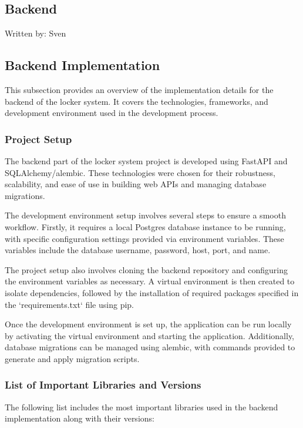\subsection{Backend}
{\tiny Written by: Sven}

\subsection{Backend Implementation} \label{sec:Implementation_Backend}

This subsection provides an overview of the implementation details for the backend of the locker system. It covers the technologies, frameworks, and development environment used in the development process.

\subsubsection{Project Setup}

The backend part of the locker system project is developed using FastAPI and SQLAlchemy/alembic. These technologies were chosen for their robustness, scalability, and ease of use in building web APIs and managing database migrations.

The development environment setup involves several steps to ensure a smooth workflow. Firstly, it requires a local Postgres database instance to be running, with specific configuration settings provided via environment variables. These variables include the database username, password, host, port, and name.

The project setup also involves cloning the backend repository and configuring the environment variables as necessary. A virtual environment is then created to isolate dependencies, followed by the installation of required packages specified in the `requirements.txt` file using pip.

Once the development environment is set up, the application can be run locally by activating the virtual environment and starting the application. Additionally, database migrations can be managed using alembic, with commands provided to generate and apply migration scripts.

\subsubsection{List of Important Libraries and Versions}

The following list includes the most important libraries used in the backend implementation along with their versions:

